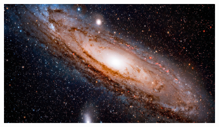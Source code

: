 \documentclass[12pt, aspectratio=169]{beamer}
\begin{document}
\begin{frame}
  \begin{figure}
       \includegraphics[width=\textwidth]{end_milkyway.jpg}
  \end{figure}
\end{frame}
  

\end{document}
